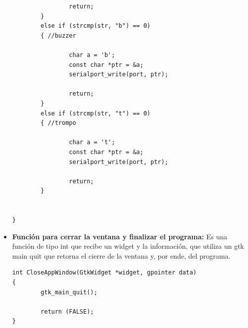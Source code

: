 \begin{itemize}
\begin{lstlisting}
                return;
        }
        else if (strcmp(str, "b") == 0)
        { //buzzer

                char a = 'b'; 
                const char *ptr = &a;
                serialport_write(port, ptr);

                return;
        }
        else if (strcmp(str, "t") == 0)
        { //trompo

                char a = 't';
                const char *ptr = &a;
                serialport_write(port, ptr);

                return;
        }

      
}
\end{lstlisting}

        \item\textbf{Función para cerrar la ventana y finalizar el programa:}
        Es una función de tipo int que recibe un widget y la información, que utiliza un gtk main quit que retorna el cierre de la ventana y, por ende, del programa.
        
\begin{lstlisting}
int CloseAppWindow(GtkWidget *widget, gpointer data)
{
        gtk_main_quit();

        return (FALSE);
}
\end{lstlisting}
        
    \end{itemize}   
   

